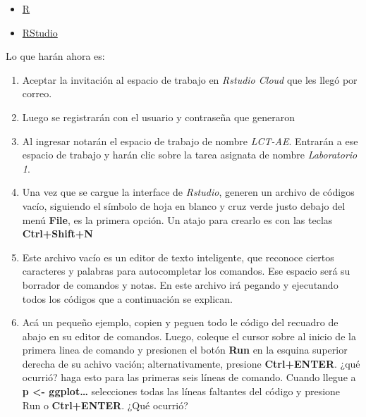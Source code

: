 \documentclass[
]{article}
\providecommand{\tightlist}{%
  \setlength{\itemsep}{0pt}\setlength{\parskip}{0pt}}
\begin{document}
\begin{itemize}
\tightlist
\item
  \href{https://www.r-project.org/}{R}
\item
  \href{https://rstudio.com/}{RStudio}
\end{itemize}

Lo que harán ahora es:

\begin{enumerate}
\def\labelenumi{\arabic{enumi}.}
\tightlist
\item
  Aceptar la invitación al espacio de trabajo en \emph{Rstudio Cloud}
  que les llegó por correo.
\item
  Luego se registrarán con el usuario y contraseña que generaron
\item
  Al ingresar notarán el espacio de trabajo de nombre \emph{LCT-AE}.
  Entrarán a ese espacio de trabajo y harán clic sobre la tarea asignata
  de nombre \emph{Laboratorio 1}.
\item
  Una vez que se cargue la interface de \emph{Rstudio}, generen un
  archivo de códigos vacío, siguiendo el símbolo de hoja en blanco y
  cruz verde justo debajo del menú \textbf{File}, es la primera opción.
  Un atajo para crearlo es con las teclas \textbf{Ctrl+Shift+N}
\item
  Este archivo vacío es un editor de texto inteligente, que reconoce
  ciertos caracteres y palabras para autocompletar los comandos. Ese
  espacio será su borrador de comandos y notas. En este archivo irá
  pegando y ejecutando todos los códigos que a continuación se explican.
\item
  Acá un pequeño ejemplo, copien y peguen todo le código del recuadro de
  abajo en su editor de comandos. Luego, coleque el cursor sobre al
  inicio de la primera linea de comando y presionen el botón
  \textbf{Run} en la esquina superior derecha de su achivo vación;
  alternativamente, presione \textbf{Ctrl+ENTER}. ¿qué ocurrió? haga
  esto para las primeras seis líneas de comando. Cuando llegue a
  \textbf{p \textless- ggplot\ldots{}} selecciones todas las líneas
  faltantes del código y presione Run o \textbf{Ctrl+ENTER}. ¿Qué
  ocurrió?
\end{enumerate}
\end{document}
